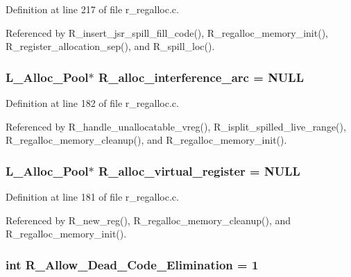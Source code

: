 Definition at line 217 of file r\_\-regalloc.c.

Referenced by R\_\-insert\_\-jsr\_\-spill\_\-fill\_\-code(), R\_\-regalloc\_\-memory\_\-init(), R\_\-register\_\-allocation\_\-sep(), and R\_\-spill\_\-loc().
\subsubsection{\setlength{\rightskip}{0pt plus 5cm}\bf{L\_\-Alloc\_\-Pool}$\ast$ \bf{R\_\-alloc\_\-interference\_\-arc} = \bf{NULL}}\label{r__regalloc_8c_cbe63b363af67955207c957b29a00b80}




Definition at line 182 of file r\_\-regalloc.c.

Referenced by R\_\-handle\_\-unallocatable\_\-vreg(), R\_\-isplit\_\-spilled\_\-live\_\-range(), R\_\-regalloc\_\-memory\_\-cleanup(), and R\_\-regalloc\_\-memory\_\-init().
\subsubsection{\setlength{\rightskip}{0pt plus 5cm}\bf{L\_\-Alloc\_\-Pool}$\ast$ \bf{R\_\-alloc\_\-virtual\_\-register} = \bf{NULL}}\label{r__regalloc_8c_d9c135d9e98c611483eaf0d10a395047}




Definition at line 181 of file r\_\-regalloc.c.

Referenced by R\_\-new\_\-reg(), R\_\-regalloc\_\-memory\_\-cleanup(), and R\_\-regalloc\_\-memory\_\-init().
\subsubsection{\setlength{\rightskip}{0pt plus 5cm}int \bf{R\_\-Allow\_\-Dead\_\-Code\_\-Elimination} = 1}\label{r__regalloc_8c_4a883ab92852b2a86d44ca35e6376774}




